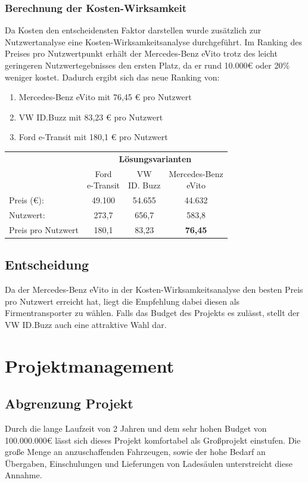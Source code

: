 \documentclass{article}
\begin{document}
	\subsubsection{Berechnung der Kosten-Wirksamkeit}
	Da Kosten den entscheidensten Faktor darstellen wurde zusätzlich zur Nutzwertanalyse eine Kosten-Wirksamkeitsanalyse durchgeführt. Im Ranking des Preises pro Nutzwertpunkt erhält der Mercedes-Benz eVito trotz des leicht geringeren Nutzwertegebnisses den ersten Platz, da er rund 10.000€ oder 20\% weniger kostet. Dadurch ergibt sich das neue Ranking von:
	\begin{enumerate}
		\item{Mercedes-Benz eVito mit 76,45 € pro Nutzwert}
		\item{VW ID.Buzz mit 83,23 € pro Nutzwert}
		\item{Ford e-Transit mit 180,1 € pro Nutzwert}
	\end{enumerate}
	\begin{center}
	\begin{tabular}{| l | c | c | c |}
		\toprule
		\multirow{2}{*}{} & \multicolumn{3}{c|}{\textbf{Lösungsvarianten}} \\ \cline{2-4}
		& \makecell{Ford \\ e-Transit} & \makecell{VW \\ ID. Buzz} & \makecell{Mercedes-Benz \\ eVito} \\ \midrule
		Preis (€): & 49.100 & 54.655 & 44.632 \\ \hline
		Nutzwert: & 273,7 & 656,7 & 583,8 \\ \midrule[0.75pt]
		Preis pro Nutzwert & 180,1 & 83,23 & \textbf{76,45} \\
		\bottomrule
	\end{tabular}
	\end{center}
	\subsection{Entscheidung}
	Da der Mercedes-Benz eVito in der Kosten-Wirksamkeitsanalyse den besten Preis pro Nutzwert erreicht hat, liegt die Empfehlung dabei diesen als Firmentransporter zu wählen. Falls das Budget des Projekts es zulässt, stellt der VW ID.Buzz auch eine attraktive Wahl dar.
	\section{Projektmanagement}
	\subsection{Abgrenzung Projekt}
	Durch die lange Laufzeit von 2 Jahren und dem sehr hohen Budget von 100.000.000€ lässt sich dieses Projekt komfortabel als Großprojekt einstufen. Die große Menge an anzuschaffenden Fahrzeugen, sowie der hohe Bedarf an Übergaben, Einschulungen und Lieferungen von Ladesäulen unterstreicht diese Annahme.
\end{document}
